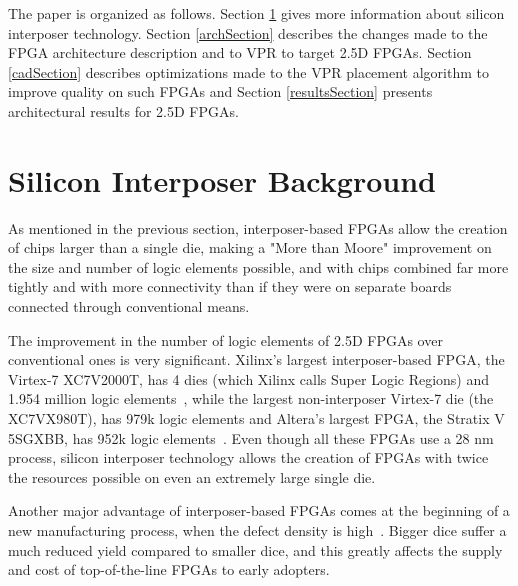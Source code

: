 \documentclass[journal]{IEEEtran}
\begin{document}
The paper is organized as follows. Section \ref{siliconSection} gives more information about silicon interposer technology. Section \ref{archSection} describes the changes made to the FPGA architecture description and to VPR to target 2.5D FPGAs. Section \ref{cadSection} describes optimizations made to the VPR placement algorithm to improve quality on such FPGAs and Section \ref{resultsSection} presents architectural results for 2.5D FPGAs.


\section{Silicon Interposer Background}
\label{siliconSection}

As mentioned in the previous section, interposer-based FPGAs allow the creation of chips larger than a single die, making a "More than Moore" improvement on the size and number of logic elements possible, and with chips combined far more tightly and with more connectivity than if they were on separate boards connected through conventional means.

The improvement in the number of logic elements of 2.5D FPGAs over conventional ones is very significant. Xilinx's largest interposer-based FPGA, the Virtex-7 XC7V2000T, has 4 dies (which Xilinx calls Super Logic Regions) and 1.954 million logic elements~\cite{xilinx7series}, while the largest non-interposer Virtex-7 die (the XC7VX980T), has 979k logic elements and Altera's largest FPGA, the Stratix V 5SGXBB, has 952k logic elements~\cite{stratixV}. Even though all these FPGAs use a 28 nm process, silicon interposer technology allows the creation of FPGAs with twice the resources possible on even an extremely large single die.

Another major advantage of interposer-based FPGAs comes at the beginning of a new manufacturing process, when the defect density is high~\cite{xilinxTSVperformance}. Bigger dice suffer a much reduced yield compared to smaller dice, and this greatly affects the supply and cost of top-of-the-line FPGAs to early adopters.
\end{document}
